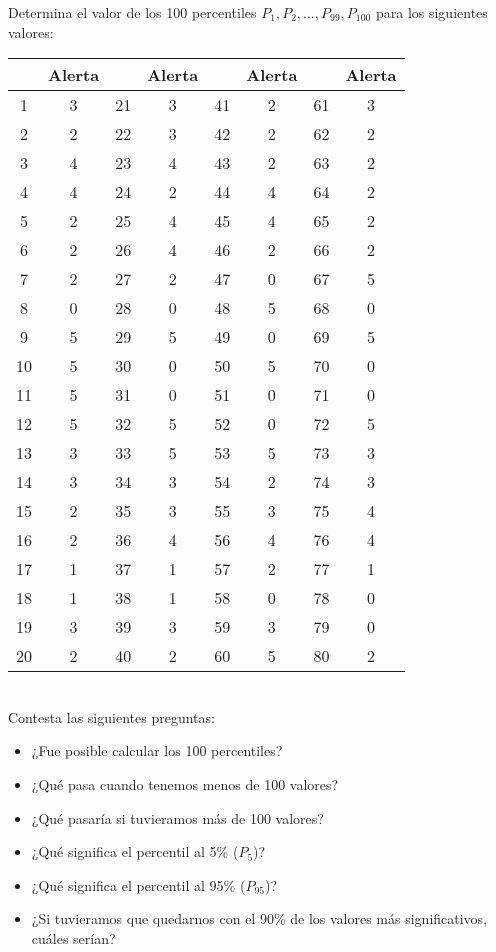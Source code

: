 \documentclass{article}
\begin{document}
Determina el valor de los 100 percentiles $P_1, P_2, ..., P_{99}, P_{100}$ para los siguientes valores:
\begin{table}[!h]
    \centering
    \begin{tabular}{|c|c|c|c|c|c|c|c|}
        \hline
        \textbf{} & \textbf{Alerta} & \textbf{} & \textbf{Alerta} & \textbf{} & \textbf{Alerta} & \textbf{} & \textbf{Alerta} \\ \hline
        1  & 3  & 21 & 3 & 41 & 2 & 61 & 3 \\ \hline
        2  & 2  & 22 & 3 & 42 & 2 & 62 & 2 \\ \hline
        3  & 4  & 23 & 4 & 43 & 2 & 63 & 2 \\ \hline
        4  & 4  & 24 & 2 & 44 & 4 & 64 & 2 \\ \hline
        5  & 2  & 25 & 4 & 45 & 4 & 65 & 2 \\ \hline
        6  & 2  & 26 & 4 & 46 & 2 & 66 & 2 \\ \hline
        7  & 2  & 27 & 2 & 47 & 0 & 67 & 5 \\ \hline
        8  & 0  & 28 & 0 & 48 & 5 & 68 & 0 \\ \hline
        9  & 5  & 29 & 5 & 49 & 0 & 69 & 5 \\ \hline
        10 & 5  & 30 & 0 & 50 & 5 & 70 & 0 \\ \hline
        11 & 5  & 31 & 0 & 51 & 0 & 71 & 0 \\ \hline
        12 & 5  & 32 & 5 & 52 & 0 & 72 & 5 \\ \hline
        13 & 3  & 33 & 5 & 53 & 5 & 73 & 3 \\ \hline
        14 & 3  & 34 & 3 & 54 & 2 & 74 & 3 \\ \hline
        15 & 2  & 35 & 3 & 55 & 3 & 75 & 4 \\ \hline
        16 & 2  & 36 & 4 & 56 & 4 & 76 & 4 \\ \hline
        17 & 1  & 37 & 1 & 57 & 2 & 77 & 1 \\ \hline
        18 & 1  & 38 & 1 & 58 & 0 & 78 & 0 \\ \hline
        19 & 3  & 39 & 3 & 59 & 3 & 79 & 0 \\ \hline
        20 & 2  & 40 & 2 & 60 & 5 & 80 & 2 \\ \hline
    \end{tabular}
\end{table}
\\
Contesta las siguientes preguntas:
\begin{itemize}
    \item ¿Fue posible calcular los 100 percentiles?
    \item ¿Qué pasa cuando tenemos menos de 100 valores?
    \item ¿Qué pasaría si tuvieramos más de 100 valores?
    \item ¿Qué significa el percentil al 5\% ($P_5$)?
    \item ¿Qué significa el percentil al 95\% ($P_{95}$)?
    \item ¿Si tuvieramos que quedarnos con el 90\% de los valores más significativos, cuáles serían?
\end{itemize}
\end{document}

